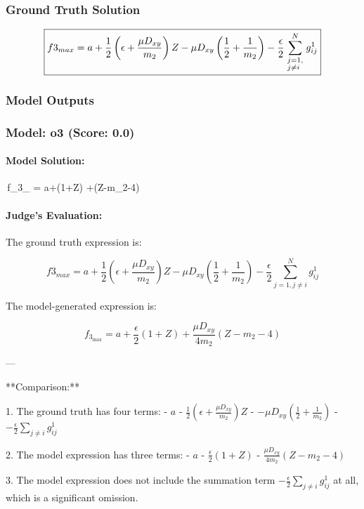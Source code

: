 \documentclass[10pt]{article}
\begin{document}
\subsubsection*{Ground Truth Solution}
\[ \boxed{f3_{max} = a + \frac{1}{2}\left( {\epsilon  + \frac{{\mu {D_{xy}}}}{{{m_2}}}} \right)Z - \mu {D_{xy}}\left( {\frac{1}{2} + \frac{1}{{{m_2}}}} \right) - \frac{\epsilon }{2}\sum\limits_{\scriptstyle j = 1,\hfill\atop \scriptstyle j \ne i\hfill}^N {g_{ij}^1}} \]

\subsubsection*{Model Outputs}
\subsubsection*{Model: o3 (Score: 0.0)}
\paragraph*{Model Solution:}
\,f_{3_{\max}} \;=\; a\;+\;\left(1+Z\right)
                  \;+\;\left(Z-m_{2}-4\right)\,

\paragraph*{Judge's Evaluation:}

The ground truth expression is:

\[
f3_{max} = a + \frac{1}{2}\left( \epsilon + \frac{\mu D_{xy}}{m_2} \right) Z - \mu D_{xy} \left( \frac{1}{2} + \frac{1}{m_2} \right) - \frac{\epsilon}{2} \sum_{j=1, j \neq i}^N g_{ij}^1
\]

The model-generated expression is:

\[
f_{3_{\max}} = a + \frac{\epsilon}{2}(1 + Z) + \frac{\mu D_{xy}}{4 m_2} (Z - m_2 - 4)
\]

---

**Comparison:**

1. The ground truth has four terms:  
   - \(a\)  
   - \(\frac{1}{2} \left( \epsilon + \frac{\mu D_{xy}}{m_2} \right) Z\)  
   - \(- \mu D_{xy} \left( \frac{1}{2} + \frac{1}{m_2} \right)\)  
   - \(- \frac{\epsilon}{2} \sum_{j \neq i} g_{ij}^1\)

2. The model expression has three terms:  
   - \(a\)  
   - \(\frac{\epsilon}{2}(1 + Z)\)  
   - \(\frac{\mu D_{xy}}{4 m_2} (Z - m_2 - 4)\)

3. The model expression does not include the summation term \(- \frac{\epsilon}{2} \sum_{j \neq i} g_{ij}^1\) at all, which is a significant omission.
\end{document}
